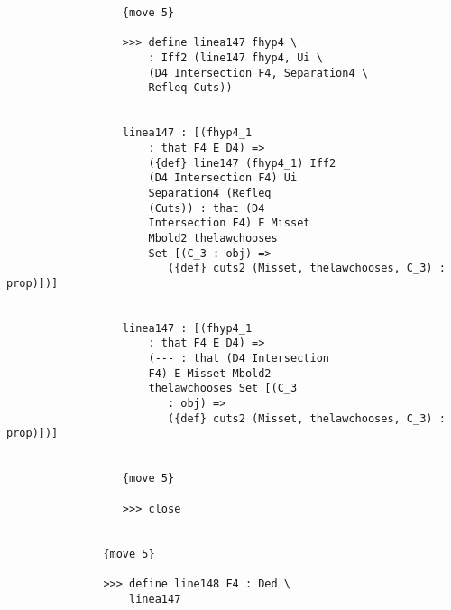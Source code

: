 \documentclass[12pt]{article}
\begin{document}
\begin{verbatim}
                  {move 5}

                  >>> define linea147 fhyp4 \
                      : Iff2 (line147 fhyp4, Ui \
                      (D4 Intersection F4, Separation4 \
                      Refleq Cuts))


                  linea147 : [(fhyp4_1 
                      : that F4 E D4) => 
                      ({def} line147 (fhyp4_1) Iff2 
                      (D4 Intersection F4) Ui 
                      Separation4 (Refleq 
                      (Cuts)) : that (D4 
                      Intersection F4) E Misset 
                      Mbold2 thelawchooses 
                      Set [(C_3 : obj) => 
                         ({def} cuts2 (Misset, thelawchooses, C_3) : prop)])]


                  linea147 : [(fhyp4_1 
                      : that F4 E D4) => 
                      (--- : that (D4 Intersection 
                      F4) E Misset Mbold2 
                      thelawchooses Set [(C_3 
                         : obj) => 
                         ({def} cuts2 (Misset, thelawchooses, C_3) : prop)])]


                  {move 5}

                  >>> close


               {move 5}

               >>> define line148 F4 : Ded \
                   linea147



\end{verbatim}
\end{document}
